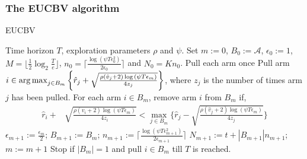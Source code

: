 \documentclass[MS,synopsis]{iitmdiss}
\begin{document}
\subsubsection{The EUCBV algorithm}

\begin{algorithm}[!th]
\caption{EUCBV}
\label{alg:eucbv}
\begin{algorithmic}
 Time horizon $T$, exploration parameters $\rho$ and $\psi$.
 Set $m:=0$, $B_{0}:=\mathcal{A}$, $\epsilon_{0}:=1$, $M=\big \lfloor \frac{1}{2}\log_{2} \frac{T}{e}\big\rfloor$, $n_{0}=\big\lceil\frac{\log{(\psi T\epsilon_{0}^{2})}}{2\epsilon_{0}}\big\rceil$ and  $N_{0}=Kn_{0}$.
\State Pull each arm once
\State Pull arm $i\in \operatorname*{arg\,max}_{j\in B_{m}}\bigg\lbrace \hat{r}_{j} + \sqrt{\frac{\rho(\hat{v}_{j}+2)\log{(\psi T\epsilon_{m})}}{4 z_{j}}} \bigg\rbrace$, where $z_j$ is the number of times arm $j$ has been pulled.
\ArmElim
\State For each arm $i \in B_{m}$, remove arm $i$ from $B_{m}$ if,
\begin{align*}
 \hat{r}_{i} + & \sqrt{\frac{\rho(\hat{v}_{i}+2)\log{(\psi T\epsilon_{m})}}{4 z_{i}}}  
  < \max_{{j}\in B_{m}}\bigg\lbrace\hat{r}_{j} -\sqrt{\frac{\rho(\hat{v}_{j}+2)\log{(\psi T\epsilon_{m})}}{4 z_{j}}} \bigg\rbrace
\end{align*}
\EndArmElim
{}
\ResParam
\State $\epsilon_{m+1}:=\frac{\epsilon_{m}}{2}$; $B_{m+1}:=B_{m}$; $n_{m+1}:=\bigg\lceil\frac{\log{(\psi T\epsilon_{m+1}^{2})}}{2\epsilon_{m+1}}\bigg\rceil$
\State $N_{m+1}:=t+|B_{m+1}| n_{m+1}$; $m:=m+1$
\EndResParam
\EndIf
\State Stop if $|B_{m}|=1$ and pull ${i}\in B_{m}$ till $T$ is reached.
\EndFor
\end{algorithmic}
\end{algorithm}
\end{document}
